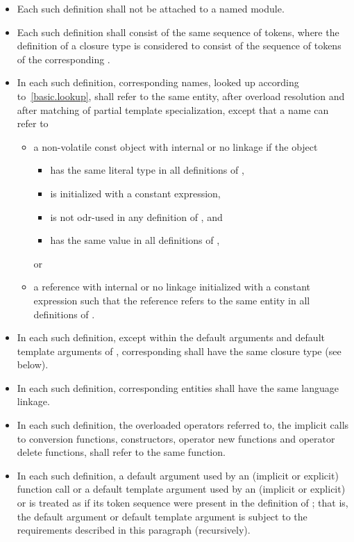 \begin{itemize}
\item Each such definition
shall not be attached to a named module.
\item Each such definition shall consist of
the same sequence of tokens,
where the definition of a closure type
is considered to consist of the sequence of tokens of
the corresponding .
\item In each such definition, corresponding names, looked up
according to~\ref{basic.lookup}, shall refer to the same entity, after
overload resolution and after matching of partial
template specialization, except that a name can refer to
\begin{itemize}
\item
a non-volatile const object with internal or no linkage if the object
\begin{itemize}
\item has the same literal type in all definitions of ,
\item is initialized with a constant expression,
\item is not odr-used in any definition of , and
\item has the same value in all definitions of ,
\end{itemize}
or
\item
a reference with internal or no linkage
initialized with a constant expression such that
the reference refers to the same entity in all definitions of .
\end{itemize}

\item In each such definition, except within
the default arguments and default template arguments of ,
corresponding  shall have
the same closure type (see below).

\item In each such definition, corresponding entities shall have the
same language linkage.

\item In each such definition, the overloaded operators referred
to, the implicit calls to conversion functions, constructors, operator
new functions and operator delete functions, shall refer to the same
function.

\item In each such definition,
a default argument used by an (implicit or explicit) function call or
a default template argument used by an (implicit or explicit)
 or 
is treated as if its token sequence
were present in the definition of ;
that is, the default argument or default template argument
is subject to the requirements described in this paragraph (recursively).


\end{itemize}
